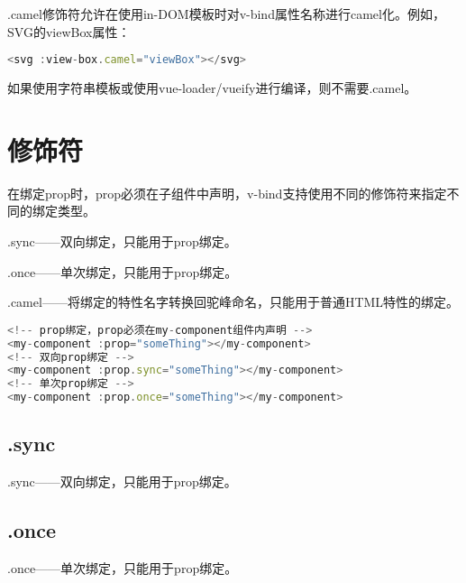 \begin{compactitem}
\item .camel修饰符允许在使用in-DOM模板时对v-bind属性名称进行camel化。例如，SVG的viewBox属性：

\begin{lstlisting}[language=JavaScript]
<svg :view-box.camel="viewBox"></svg>
\end{lstlisting}


\item 如果使用字符串模板或使用vue-loader/vueify进行编译，则不需要.camel。
\end{compactitem}


\section{修饰符}

在绑定prop时，prop必须在子组件中声明，v-bind支持使用不同的修饰符来指定不同的绑定类型。


\begin{compactitem}
\item .sync——双向绑定，只能用于prop绑定。
\item .once——单次绑定，只能用于prop绑定。
\item .camel——将绑定的特性名字转换回驼峰命名，只能用于普通HTML特性的绑定。
\end{compactitem}


\begin{lstlisting}[language=JavaScript]
<!-- prop绑定，prop必须在my-component组件内声明 -->
<my-component :prop="someThing"></my-component>
<!-- 双向prop绑定 -->
<my-component :prop.sync="someThing"></my-component>
<!-- 单次prop绑定 -->
<my-component :prop.once="someThing"></my-component>
\end{lstlisting}


\subsection{.sync}

.sync——双向绑定，只能用于prop绑定。



\subsection{.once}

.once——单次绑定，只能用于prop绑定。


\begin{lstlisting}[language=JavaScript]

\end{lstlisting}



